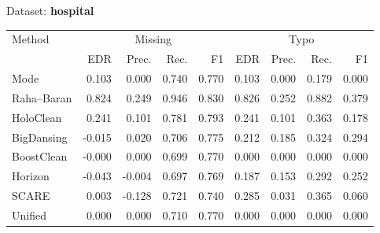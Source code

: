 \begin{subtable}[t]{0.492\linewidth}
\caption{Dataset: \textbf{hospital}}
\label{tab:q1-acc-hospital}
\centering
\begin{tabular}{lrrrrrrrr}
\toprule
\multirow{2}{*}{Method} &\multicolumn{4}{c}{Missing} &\multicolumn{4}{c}{Typo}\\
\cmidrule(lr){2-5}\cmidrule(l){6-9}
 & EDR & Prec. & Rec. & F1 & EDR & Prec. & Rec. & F1\\
\midrule
\midrule
Mode & 0.103 & 0.000 & 0.740 & 0.770 & 0.103 & 0.000 & 0.179 & 0.000 \\
Raha–Baran & 0.824 & 0.249 & 0.946 & 0.830 & 0.826 & 0.252 & 0.882 & 0.379 \\
HoloClean & 0.241 & 0.101 & 0.781 & 0.793 & 0.241 & 0.101 & 0.363 & 0.178 \\
BigDansing & -0.015 & 0.020 & 0.706 & 0.775 & 0.212 & 0.185 & 0.324 & 0.294 \\
BoostClean & -0.000 & 0.000 & 0.699 & 0.770 & 0.000 & 0.000 & 0.000 & 0.000 \\
Horizon & -0.043 & -0.004 & 0.697 & 0.769 & 0.187 & 0.153 & 0.292 & 0.252 \\
SCARE & 0.003 & -0.128 & 0.721 & 0.740 & 0.285 & 0.031 & 0.365 & 0.060 \\
Unified & 0.000 & 0.000 & 0.710 & 0.770 & 0.000 & 0.000 & 0.000 & 0.000 \\
\bottomrule
\bottomrule
\end{tabular}
\end{subtable}